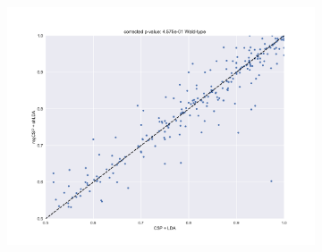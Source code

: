 \begin{figure}
    \centering
    \begin{subfigure}[t]{0.3\textwidth}
        \centering
        \includegraphics[width=\textwidth]{Figures/CSP1.pdf}
    \end{subfigure}%
     

\end{figure}
